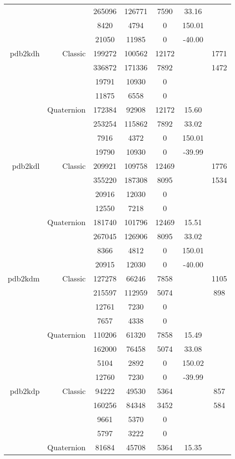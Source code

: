 \begin{xltabular}{\textwidth}{r|rcccSc}
& & 265096 & 126771 & 7590 & 33.16 & \\
& & 8420 & 4794 & 0 & 150.01 & \\
& & 21050 & 11985 & 0 & -40.00 & \\ \addlinespace
pdb2kdh & Classic & 199272 & 100562 & 12172 & & 1771 \\
& & 336872 & 171336 & 7892 & & 1472 \\
& & 19791 & 10930 & 0 & & \\
& & 11875 & 6558 & 0 & & \\
& Quaternion & 172384 & 92908 & 12172 & 15.60 & \\
& & 253254 & 115862 & 7892 & 33.02 & \\
& & 7916 & 4372 & 0 & 150.01 & \\
& & 19790 & 10930 & 0 & -39.99 & \\ \addlinespace
pdb2kdl & Classic & 209921 & 109758 & 12469 & & 1776 \\
& & 355220 & 187308 & 8095 & & 1534 \\
& & 20916 & 12030 & 0 & & \\
& & 12550 & 7218 & 0 & & \\
& Quaternion & 181740 & 101796 & 12469 & 15.51 & \\
& & 267045 & 126906 & 8095 & 33.02 & \\
& & 8366 & 4812 & 0 & 150.01 & \\
& & 20915 & 12030 & 0 & -40.00 & \\ \addlinespace
pdb2kdm & Classic & 127278 & 66246 & 7858 & & 1105 \\
& & 215597 & 112959 & 5074 & & 898 \\
& & 12761 & 7230 & 0 & & \\
& & 7657 & 4338 & 0 & & \\
& Quaternion & 110206 & 61320 & 7858 & 15.49 & \\
& & 162000 & 76458 & 5074 & 33.08 & \\
& & 5104 & 2892 & 0 & 150.02 & \\
& & 12760 & 7230 & 0 & -39.99 & \\ \addlinespace
pdb2kdp & Classic & 94222 & 49530 & 5364 & & 857 \\
& & 160256 & 84348 & 3452 & & 584 \\
& & 9661 & 5370 & 0 & & \\
& & 5797 & 3222 & 0 & & \\
& Quaternion & 81684 & 45708 & 5364 & 15.35 & \\

\end{xltabular}
